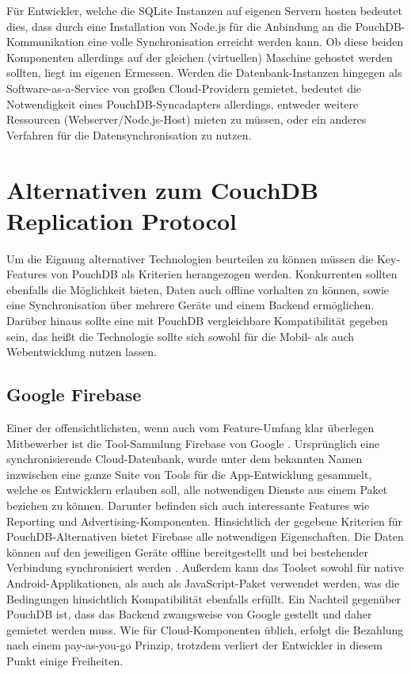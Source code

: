 Für Entwickler, welche die SQLite Instanzen auf eigenen Servern hosten bedeutet dies, dass durch eine Installation von Node.js für die Anbindung an die PouchDB-Kommunikation eine volle Synchronisation erreicht werden kann. Ob diese beiden Komponenten allerdings auf der gleichen (virtuellen) Maschine gehostet werden sollten, liegt im eigenen Ermessen. Werden die Datenbank-Instanzen hingegen als Software-as-a-Service von großen Cloud-Providern gemietet, bedeutet die Notwendigkeit eines PouchDB-Syncadapters allerdings, entweder weitere Ressourcen (Webserver/Node.js-Host) mieten zu müssen, oder ein anderes Verfahren für die Datensynchronisation zu nutzen.

\section{Alternativen zum CouchDB Replication Protocol}
Um die Eignung alternativer Technologien beurteilen zu können müssen die Key-Features von PouchDB als Kriterien herangezogen werden. Konkurrenten sollten ebenfalls die Möglichkeit bieten, Daten auch offline vorhalten zu können, sowie eine Synchronisation über mehrere Geräte und einem Backend ermöglichen. Darüber hinaus sollte eine mit PouchDB vergleichbare Kompatibilität gegeben sein, das heißt die Technologie sollte sich sowohl für die Mobil- als auch Webentwicklung nutzen lassen.

\subsection*{Google Firebase}
Einer der offensichtlichsten, wenn auch vom Feature-Umfang klar überlegen Mitbewerber ist die Tool-Sammlung Firebase von Google \cite{google:firebase}. Ursprünglich eine synchronisierende Cloud-Datenbank, wurde unter dem bekannten Namen inzwischen eine ganze Suite von Tools für die App-Entwicklung gesammelt, welche es Entwicklern erlauben soll, alle notwendigen Dienste aus einem Paket beziehen zu können. Darunter befinden sich auch interessante Features wie Reporting und Advertising-Komponenten. Hinsichtlich der gegebene Kriterien für PouchDB-Alternativen bietet Firebase alle notwendigen Eigenschaften. Die Daten können auf den jeweiligen Geräte offline bereitgestellt und bei bestehender Verbindung synchronisiert werden \cite{google:offlinejs}\cite{google:offlineandroid}. Außerdem kann das Toolset sowohl für native Android-Applikationen, als auch als JavaScript-Paket verwendet werden, was die Bedingungen hinsichtlich Kompatibilität ebenfalls erfüllt. Ein Nachteil gegenüber PouchDB ist, dass das Backend zwangsweise von Google gestellt und daher gemietet werden muss. Wie für Cloud-Komponenten üblich, erfolgt die Bezahlung nach einem pay-as-you-go Prinzip, trotzdem verliert der Entwickler in diesem Punkt einige Freiheiten.

